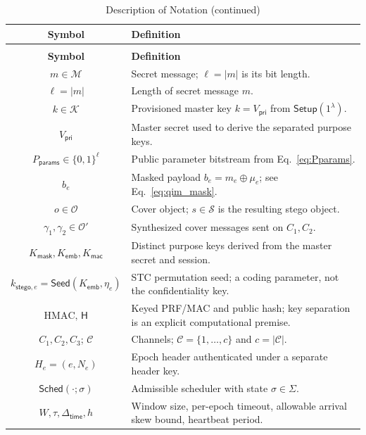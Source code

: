 \documentclass[pdflatex,sn-mathphys-num]{sn-jnl}%
\renewcommand{\arraystretch}{1.2}
\renewcommand{\arraystretch}{1.0}
\theoremstyle{definition}
\theoremstyle{game}
\theoremstyle{thmstyleone}%
\theoremstyle{thmstyletwo}%
\theoremstyle{thmstylethree}%
\begin{document}
\begingroup
\scriptsize
\renewcommand{\arraystretch}{1.0}
\begin{longtable}{|c|p{5.0cm}|}
\caption{Description of Notation}\label{tab:notation_description}\\
\hline
\textbf{Symbol} & \textbf{Definition} \\ \hline
\endfirsthead
\caption[]{Description of Notation (continued)}\\
\hline
\textbf{Symbol} & \textbf{Definition} \\ \hline
\endhead
$m \in \mathcal{M}$ & Secret message; $\ell = |m|$ is its bit length. \\ \hline
$\ell = |m|$ & Length of secret message $m$. \\ \hline
$k \in \mathcal{K}$ & Provisioned master key $k=V_{\mathsf{pri}}$ from $\mathsf{Setup}(1^\lambda)$. \\ \hline
$V_{\mathsf{pri}}$ & Master secret used to derive the separated purpose keys. \\ \hline
$P_{\mathsf{params}} \in \{0,1\}^{\ell}$ & Public parameter bitstream from Eq.~\eqref{eq:Pparams}. \\ \hline
$b_e$ & Masked payload $b_e=m_e\oplus\mu_e$; see Eq.~\eqref{eq:qim_mask}. \\ \hline
$o \in \mathcal{O}$ & Cover object; $s \in \mathcal{S}$ is the resulting stego object. \\ \hline
$\gamma_1,\gamma_2 \in \mathcal{O}'$ & Synthesized cover messages sent on $C_1,C_2$. \\ \hline
$K_{\mathsf{mask}},K_{\mathsf{emb}},K_{\mathsf{mac}}$ & Distinct purpose keys derived from the master secret and session. \\ \hline
$k_{\mathsf{stego},e}=\mathsf{Seed}(K_{\mathsf{emb}},\eta_e)$ & STC permutation seed; a coding parameter, not the confidentiality key. \\ \hline
$\mathrm{HMAC},\,\mathsf{H}$ & Keyed PRF/MAC and public hash; key separation is an explicit computational premise. \\ \hline
$C_1,C_2,C_3$; $\mathcal{C}$ & Channels; $\mathcal{C}=\{1,\dots,c\}$ and $c=|\mathcal{C}|$. \\ \hline
$H_e=(e,N_e)$ & Epoch header authenticated under a separate header key. \\ \hline
$\mathsf{Sched}(\cdot;\sigma)$ & Admissible scheduler with state $\sigma\in\Sigma$. \\ \hline
$W,\tau,\Delta_{\mathsf{time}},h$ & Window size, per-epoch timeout, allowable arrival skew bound, heartbeat period. \\ \hline

\end{longtable}
\end{document}
